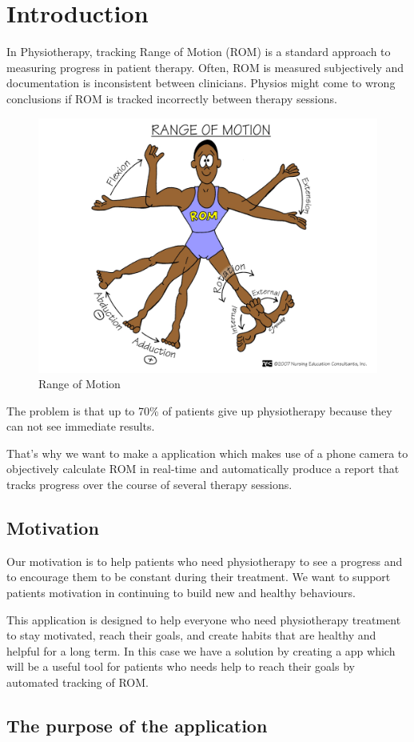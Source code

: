 \chapter{Introduction}
\par In Physiotherapy, tracking Range of Motion (ROM) is a standard approach to measuring progress in patient therapy. Often, ROM is measured subjectively and documentation is inconsistent between clinicians. Physios might come to wrong conclusions if ROM is tracked incorrectly between therapy sessions.

\begin{figure}[htbp]
	\centerline{\includegraphics[scale=0.25]{fig/rangeofmotion.png}}  
	\caption{Range of Motion}
\end{figure}

\par The problem is that up to 70\% of patients give up physiotherapy because they can not see immediate results.
\par That's why we want to make a application which makes use of a phone camera to objectively calculate ROM in real-time and automatically produce a report that tracks progress over the course of several therapy sessions.

\section{Motivation}
\par Our motivation is to help patients who need physiotherapy to see a progress and to encourage them to be constant during their treatment. We want to support patients motivation in continuing to build new and healthy behaviours. 
\par This application is designed to help everyone who need physiotherapy treatment to stay motivated, reach their goals, and create habits that are healthy and helpful for a long term. In this case we have a solution by creating a app which will be a useful tool for patients who needs help to reach their goals by automated tracking of ROM.

\section{The purpose of the application}
